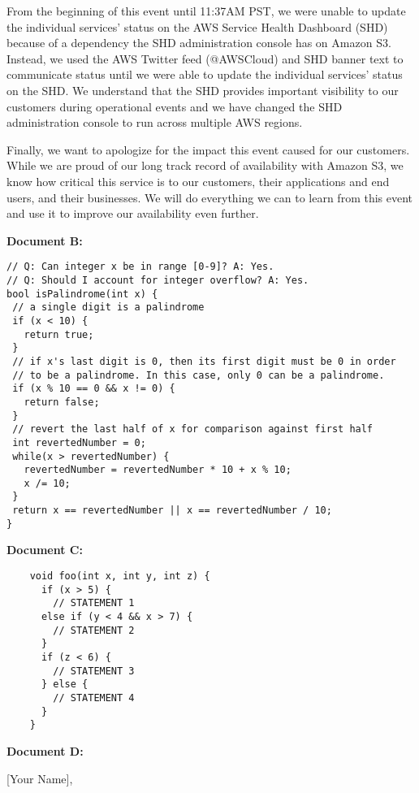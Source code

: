\documentclass{report}
\begin{document}
\begin{spacing}{1.4}
\begin{enumerate}[leftmargin=*]
      From the beginning of this event until 11:37AM PST, we were unable to update the individual services’ status on the AWS Service Health Dashboard (SHD) because of a dependency the SHD administration console has on Amazon S3. Instead, we used the AWS Twitter feed (@AWSCloud) and SHD banner text to communicate status until we were able to update the individual services’ status on the SHD.  We understand that the SHD provides important visibility to our customers during operational events and we have changed the SHD administration console to run across multiple AWS regions.

      Finally, we want to apologize for the impact this event caused for our customers. While we are proud of our long track record of availability with Amazon S3, we know how critical this service is to our customers, their applications and end users, and their businesses. We will do everything we can to learn from this event and use it to improve our availability even further.~
    
\vspace{0.5in}
    \textbf{Document B:}

    \begin{lstlisting}
// Q: Can integer x be in range [0-9]? A: Yes.
// Q: Should I account for integer overflow? A: Yes.
bool isPalindrome(int x) {
 // a single digit is a palindrome
 if (x < 10) {
   return true;
 }
 // if x's last digit is 0, then its first digit must be 0 in order
 // to be a palindrome. In this case, only 0 can be a palindrome.
 if (x % 10 == 0 && x != 0) {
   return false;
 }
 // revert the last half of x for comparison against first half
 int revertedNumber = 0;
 while(x > revertedNumber) {
   revertedNumber = revertedNumber * 10 + x % 10;
   x /= 10;
 }
 return x == revertedNumber || x == revertedNumber / 10;
}
\end{lstlisting}
    \newpage
    \textbf{Document C:}
    \begin{lstlisting}
    void foo(int x, int y, int z) {
      if (x > 5) {
        // STATEMENT 1
      else if (y < 4 && x > 7) {
        // STATEMENT 2
      }
      if (z < 6) {
        // STATEMENT 3
      } else {
        // STATEMENT 4
      }
    }
    \end{lstlisting}

\vspace{0.5in}
    
    \textbf{Document D:}

    [Your Name],


\end{enumerate}
\end{spacing}
\end{document}
